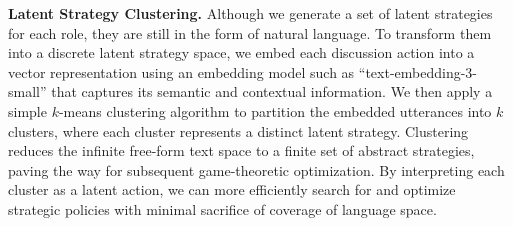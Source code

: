 \textbf{Latent Strategy Clustering.}
Although we generate a set of latent strategies for each role, they are still in the form of natural language. To transform them into a discrete latent strategy space, we embed each discussion action into a vector representation using an embedding model such as ``text-embedding-3-small'' that captures its semantic and contextual information. We then apply a simple $k$-means clustering algorithm to partition the embedded utterances into $k$ clusters, where each cluster represents a distinct latent strategy. Clustering reduces the infinite free-form text space to a finite set of abstract strategies, paving the way for subsequent game-theoretic optimization. By interpreting each cluster as a latent action, we can more efficiently search for and optimize strategic policies with minimal sacrifice of coverage of language space. 




